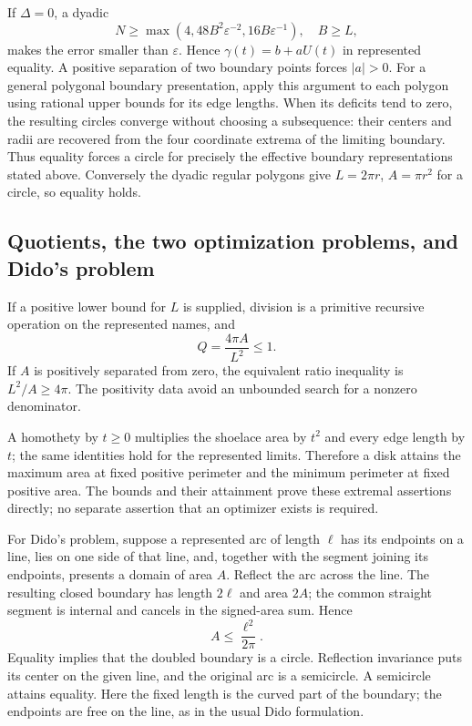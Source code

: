 If \(\Delta=0\), a dyadic
\[
 N\ge\max(4,48B^2\varepsilon^{-2},16B\varepsilon^{-1}),\quad B\ge L,
\]
makes the error smaller than \(\varepsilon\).  Hence
\(\gamma(t)=b+aU(t)\) in represented equality.  A positive
separation of two boundary points forces \(|a|>0\).
For a general polygonal boundary presentation, apply this argument
to each polygon using rational upper bounds for its edge lengths.
When its deficits tend to zero, the resulting circles converge
without choosing a subsequence: their centers and radii are recovered
from the four coordinate extrema of the limiting boundary.  Thus
equality forces a circle for precisely the effective boundary
representations stated above.  Conversely the dyadic regular polygons
give \(L=2\pi r\), \(A=\pi r^2\) for a circle, so equality holds.

\subsection{Quotients, the two optimization problems, and Dido's problem}
If a positive lower bound for \(L\) is supplied, division is a
primitive recursive operation on the represented names, and
\[
 Q=\frac{4\pi A}{L^2}\le1.
\]
If \(A\) is positively separated from zero, the equivalent ratio
inequality is \(L^2/A\ge4\pi\).  The positivity data avoid an
unbounded search for a nonzero denominator.

A homothety by \(t\ge0\) multiplies the shoelace area by \(t^2\)
and every edge length by \(t\); the same identities hold for the
represented limits.  Therefore a disk attains the maximum area at
fixed positive perimeter and the minimum perimeter at fixed positive
area.  The bounds and their attainment prove these extremal assertions
directly; no separate assertion that an optimizer exists is required.

For Dido's problem, suppose a represented arc of length \(\ell\)
has its endpoints on a line, lies on one side of that line, and,
together with the segment joining its endpoints, presents a domain
of area \(A\).  Reflect the arc across the line.  The resulting
closed boundary has length \(2\ell\) and area \(2A\); the common
straight segment is internal and cancels in the signed-area sum.
Hence
\[
                       A\le\frac{\ell^2}{2\pi}.
\]
Equality implies that the doubled boundary is a circle.  Reflection
invariance puts its center on the given line, and the original arc
is a semicircle.  A semicircle attains equality.  Here the fixed
length is the curved part of the boundary; the endpoints are free
on the line, as in the usual Dido formulation.

